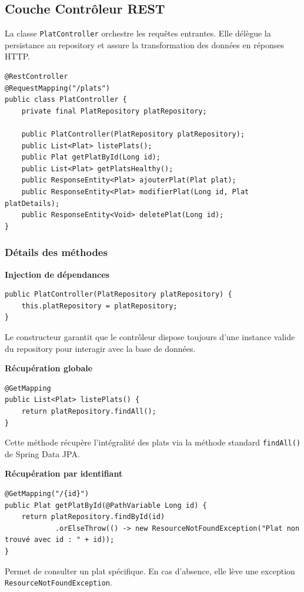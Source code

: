 \documentclass[12pt,a4paper,french]{article}
\begin{document}
\subsection{Couche Contrôleur REST}
La classe \texttt{PlatController} orchestre les requêtes entrantes. Elle délègue la persistance
au repository et assure la transformation des données en réponses HTTP.

\begin{tcolorbox}[projectbox, title=Signature de PlatController.java]
    \begin{verbatim}
@RestController
@RequestMapping("/plats")
public class PlatController {
    private final PlatRepository platRepository;

    public PlatController(PlatRepository platRepository);
    public List<Plat> listePlats();
    public Plat getPlatById(Long id);
    public List<Plat> getPlatsHealthy();
    public ResponseEntity<Plat> ajouterPlat(Plat plat);
    public ResponseEntity<Plat> modifierPlat(Long id, Plat platDetails);
    public ResponseEntity<Void> deletePlat(Long id);
}
\end{verbatim}
\end{tcolorbox}

\subsubsection{Détails des méthodes}

\textbf{Injection de dépendances}
\begin{verbatim}
public PlatController(PlatRepository platRepository) {
    this.platRepository = platRepository;
}
\end{verbatim}
Le constructeur garantit que le contrôleur dispose toujours d'une instance valide du repository pour
interagir avec la base de données.

\vspace{1em}
\textbf{Récupération globale}
\begin{verbatim}
@GetMapping
public List<Plat> listePlats() {
    return platRepository.findAll();
}
\end{verbatim}
Cette méthode récupère l'intégralité des plats via la méthode standard \texttt{findAll()} de Spring Data JPA.

\vspace{1em}
\textbf{Récupération par identifiant}
\begin{verbatim}
@GetMapping("/{id}")
public Plat getPlatById(@PathVariable Long id) {
    return platRepository.findById(id)
            .orElseThrow(() -> new ResourceNotFoundException("Plat non trouvé avec id : " + id));
}
\end{verbatim}
Permet de consulter un plat spécifique. En cas d'absence, elle lève une exception
\texttt{ResourceNotFoundException}.
\end{document}
